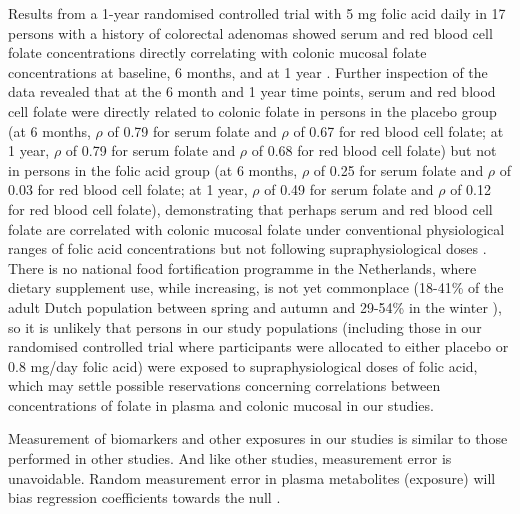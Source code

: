 \noindent Results from a 1-year randomised controlled trial with 5 mg folic acid daily in 17 persons with a history of colorectal adenomas showed serum and red blood cell folate concentrations directly correlating with colonic mucosal folate concentrations at baseline, 6 months, and at 1 year \cite{c735}. Further inspection of the data revealed that at the 6 month and 1 year time points, serum and red blood cell folate were directly related to colonic folate in persons in the placebo group (at 6 months, $\rho$ of 0.79 for serum folate and $\rho$ of 0.67 for red blood cell folate; at 1 year, $\rho$ of 0.79 for serum folate and $\rho$ of 0.68 for red blood cell folate) but not in persons in the folic acid group (at 6 months, $\rho$ of 0.25 for serum folate and $\rho$ of 0.03 for red blood cell folate; at 1 year, $\rho$ of 0.49 for serum folate and $\rho$ of 0.12 for red blood cell folate), demonstrating that perhaps serum and red blood cell folate are correlated with colonic mucosal folate under conventional 
physiological ranges of folic acid concentrations but not following supraphysiological doses \cite{c735}. There is no national food fortification programme in the Netherlands, where dietary supplement use, while increasing, is not yet commonplace (18-41\% of the adult Dutch population between spring and autumn and 29-54\% in the winter \cite{c720}), so it is unlikely that persons in our study populations (including those in our randomised controlled trial where participants were allocated to either placebo or 0.8 mg/day folic acid) were exposed to supraphysiological doses of folic acid, which may settle possible reservations concerning correlations between concentrations of folate in plasma and colonic mucosal in our studies. 
 
\noindent Measurement of biomarkers and other exposures in our studies is similar to those performed in other studies. And like other studies, measurement error is unavoidable. Random measurement error in plasma metabolites (exposure) will bias regression coefficients towards the null \cite{c743,c744}. 
 
